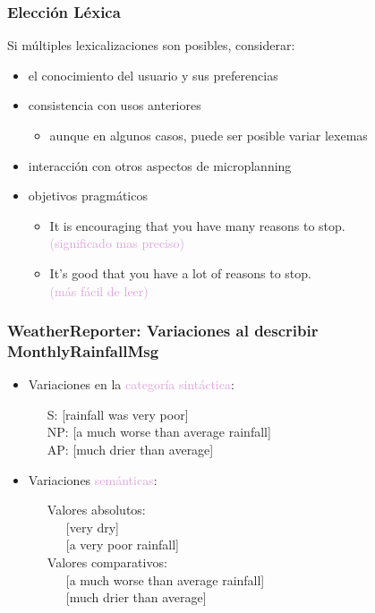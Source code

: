 \documentclass[compress,color=usenames]{beamer}
\newcommand{\mH}[1]{\textcolor{Plum}{#1}}
\begin{document}
\begin{frame}
\frametitle{Elecci\'on L\'exica}

Si m\'ultiples lexicalizaciones son posibles, considerar:

\begin{itemize}

\item el conocimiento del usuario y sus preferencias
\item consistencia con usos anteriores
\begin{itemize}
\item aunque en algunos casos, puede ser posible variar lexemas
\end{itemize}
\item interacci\'on con otros aspectos de microplanning
\item objetivos pragm\'aticos
\begin{itemize}
\item It is encouraging that you have many reasons to stop.\\ \hfill       \mH{(significado mas preciso)}
\item It's good that you have a lot of reasons to stop.\\ \hfill \mH{(m\'as f\'acil de leer)}
\end{itemize}
\end{itemize}

\end{frame}

\begin{frame}
\frametitle{WeatherReporter: Variaciones al describir MonthlyRainfallMsg}

\begin{itemize}
\item Variaciones en la \mH{categor\'ia sint\'actica}:

\ \ \  {{S:                [rainfall was very poor]}}\\
\ \ \  {{NP:        [a much worse than average rainfall]}}\\
\ \ \  {{AP:        [much drier than average]}}\\

\item {{Variaciones \mH{sem\'anticas}:}}

\ \ \ Valores absolutos:\\        
\ \ \ \ \ \                [very dry]\\
\ \ \ \ \ \                 [a very poor rainfall]\\

\ \ \ Valores comparativos:        \\
\ \ \ \ \ \ [a much worse than average rainfall]\\
\ \ \ \ \ \ [much drier than average] 
\end{itemize}
\end{frame}
\end{document}
